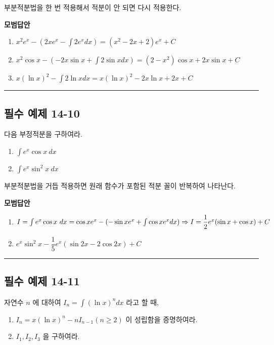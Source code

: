 \documentclass[a4paper,11pt]{article}
\begin{document}
\begin{studybox}
부분적분법을 한 번 적용해서 적분이 안 되면 다시 적용한다.
\end{studybox}

\textbf{모범답안}
\begin{enumerate}[label=(\arabic*)]
    \item $x^2 e^x-(2xe^x-\int 2e^x dx)=(x^{2}-2x+2)e^{x}+C$
    \item $x^2 \cos x -(-2x \sin x + \int 2 \sin x dx)=(2-x^{2})\cos x+2x\sin x+C$
    \item $x(\ln x)^2- \int 2 \ln x dx=x(\ln x)^{2}-2x\ln x+2x+C$
\end{enumerate}

\vspace{0.5cm}
\hrule
\vspace{0.5cm}

\subsection*{필수 예제 14-10}
다음 부정적분을 구하여라.
\begin{enumerate}[label=(\arabic*)]
    \item $\int e^{x}\cos x~dx$
    \item $\int e^{x}\sin^{2}x~dx$
\end{enumerate}

\begin{studybox}
부분적분법을 거듭 적용하면 원래 함수가 포함된 적분 꼴이 반복하여 나타난다.
\end{studybox}

\textbf{모범답안}
\begin{enumerate}[label=(\arabic*)]
    \item $I=\int e^{x}\cos x~dx \\
    = \cos x e^x-(-\sin x e^x + \int \cos x e^x dx) \Rightarrow I=\dfrac{1}{2}e^{x}(\sin x+\cos x)+C$
    \item $e^{x}\sin^{2}x-\dfrac{1}{5}e^{x}(\sin 2x-2\cos 2x)+C$
\end{enumerate}

\vspace{0.5cm}
\hrule
\vspace{0.5cm}

\subsection*{필수 예제 14-11}
자연수 $n$ 에 대하여 $I_{n}=\int(\ln x)^{n}dx$ 라고 할 때,
\begin{enumerate}[label=(\arabic*)]
    \item $I_{n}=x(\ln x)^{n}-nI_{n-1}(n\ge 2)$ 이 성립함을 증명하여라.
    \item $I_{1}, I_{2}, I_{3}$ 을 구하여라.
\end{enumerate}
\end{document}

